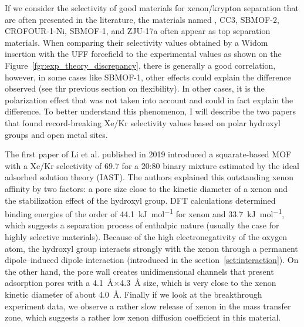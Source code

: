 \documentclass[main]{subfiles}
\begin{document}
If we consider the selectivity of good materials for xenon/krypton separation that are often presented in the literature, the materials named ,\autocite{Wang_2014} CC3,\autocite{Chen_2014} SBMOF-2,\autocite{Chen_2015} CROFOUR-1-Ni,\autocite{Mohamed_2016}  SBMOF-1,\autocite{Banerjee_2016} \autocite{Li_2019} and ZJU-17a\autocite{Pei_2022} often appear as top separation materials.
When comparing their selectivity values obtained by a Widom insertion with the UFF forcefield to the experimental values as shown on the Figure~\ref{fgr:exp_theory_discrepancy}, there is generally a good correlation, however, in some cases like SBMOF-1, other effects could explain the difference observed (see thr previous section on flexibility). In other cases, it is the polarization effect that was not taken into account and could in fact explain the difference. To better understand this phenomenon, I will describe the two papers that found record-breaking Xe/Kr selectivity values based on polar hydroxyl groups and open metal sites.

The first paper of Li et al.\autocite{Li_2019} published in 2019 introduced a squarate-based MOF with a Xe/Kr selectivity of $69.7$ for a 20:80 binary mixture estimated by the ideal adsorbed solution theory (IAST)\autocite{Cessford_2012}. The authors explained this outstanding xenon affinity by two factors: a pore size close to the kinetic diameter of a xenon and the stabilization effect of the hydroxyl group. DFT calculations determined binding energies of the order of \SI{44.1}{\kJ\per\mole} for xenon and \SI{33.7}{\kJ\per\mole}, which suggests a separation process of enthalpic nature (usually the case for highly selective materials). Because of the high electronegativity of the oxygen atom, the hydroxyl group interacts strongly with the xenon through a permanent dipole--induced dipole interaction (introduced in the section~\ref{sct:interaction}). On the other hand, the pore wall creates unidimensional channels that present adsorption pores with a \SI{4.1}{\angstrom}$\times$\SI{4.3}{\angstrom} size, which is very close to the xenon kinetic diameter of about \SI{4.0}{\angstrom}. Finally if we look at the breakthrough experiment data, we observe a rather slow release of xenon in the mass transfer zone, which suggests a rather low xenon diffusion coefficient in this material. 
\end{document}

